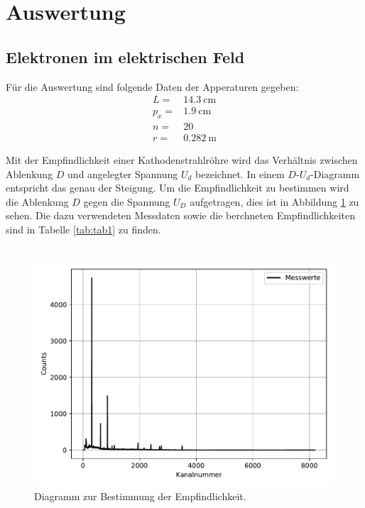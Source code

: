 \section{Auswertung}
\subsection{Elektronen im elektrischen Feld}

\label{sec:Auswertung}
Für die Auswertung sind folgende Daten der Apperaturen gegeben:
\begin{align*}
  L=&\SI{14,3}{\cm} \\
  p_{x}=&\SI{1,9}{\cm}\\
  n=&20    \\
  r=&\SI{0,282}{\m}
\end{align*}

Mit der Empfindlichkeit einer Kathodenstrahlröhre wird das Verhältnis zwischen Ablenkung $D$
und angelegter Spannung $U_d$ bezeichnet. In einem $D\text{-}U_d$-Diagramm entspricht das genau der
Steigung. Um die Empfindlichkeit zu bestimmen wird die Ablenkung $D$ gegen die
Spannung $U_D$ aufgetragen, dies ist in Abbildung \ref{fig:plot1} zu sehen.
Die dazu verwendeten Messdaten sowie die berchneten Empfindlichkeiten
sind in Tabelle \ref{tab:tab1} zu finden.\\
\\

\begin{figure}
  \centering
  \includegraphics{plot1.pdf}
  \caption{Diagramm zur Bestimmung der Empfindlichkeit.}
  \label{fig:plot1}
\end{figure}

